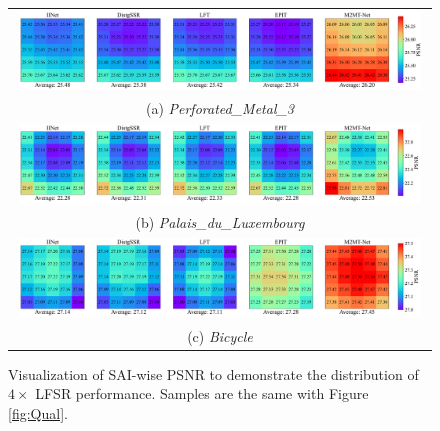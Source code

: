 \begin{figure}[ht]
    \centering
    \tabcolsep=0.05cm
    \renewcommand{\arraystretch}{1.0}
    \begin{tabular}{c}
        \includegraphics[width=0.98\textwidth]{img/qual_matrix/Perforated_Metal_3.h5.pdf} \\
        (a) \textit{Perforated\_Metal\_3} \\
        \includegraphics[width=0.98\textwidth]{img/qual_matrix/Palais_du_Luxembourg.h5.pdf} \\
        (b) \textit{Palais\_du\_Luxembourg} \\
        \includegraphics[width=0.98\textwidth]{img/qual_matrix/bicycle.h5.pdf} \\
        (c) \textit{Bicycle}
    \end{tabular}

    \caption{Visualization of SAI-wise PSNR to demonstrate the distribution of $4\times$ LFSR performance. Samples are the same with Figure \ref*{fig:Qual}.}
    \label{fig:QualMatrix}
\end{figure}